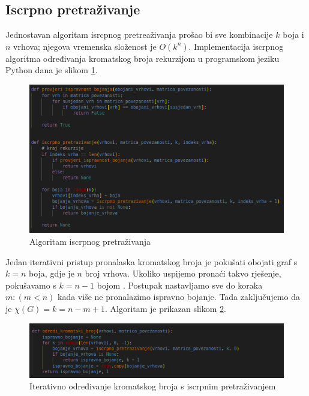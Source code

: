 \documentclass[times, utf8, zavrsni, numeric]{fer}
\begin{document}
\subsection{Iscrpno pretraživanje}
Jednostavan algoritam isrcpnog pretreaživanja prošao bi sve kombinacije $k$ boja i $n$ vrhova; njegova vremenska složenost je $O(k^n)$. Implementacija iscrpnog algoritma određivanja kromatskog broja rekurzijom u programskom jeziku Python dana je slikom \ref{fig:algoritam iscrpnog pretraživanja}.

\begin{figure}[htb]
\centering
\includegraphics[width=12cm]{images/iscrpno_pretrazivanje.png}
\caption{Algoritam iscrpnog pretraživanja}
\label{fig:algoritam iscrpnog pretraživanja}
\end{figure}

Jedan iterativni pristup pronalaska kromatskog broja je pokušati obojati graf s $k=n$ boja, gdje je $n$ broj vrhova. Ukoliko uspijemo pronaći takvo rješenje, pokušavamo s $k=n-1$ bojom \cite{geeksforgeeks}. Postupak nastavljamo sve do koraka $m: (m < n)$ kada više ne pronalazimo ispravno bojanje. Tada zaključujemo da je $\chi(G)=k=n-m+1$. Algoritam je prikazan slikom \ref{fig:algoritam iterativnog iscprnog odredivanja kromatskog broja}.

\begin{figure}[htb]
\centering
\includegraphics[width=12cm]{images/iterativni_algoritam_iscprnog_pretrazivanja.png}
\caption{Iterativno određivanje kromatskog broja s iscrpnim pretraživanjem}
\label{fig:algoritam iterativnog iscprnog odredivanja kromatskog broja}
\end{figure}
\end{document}
